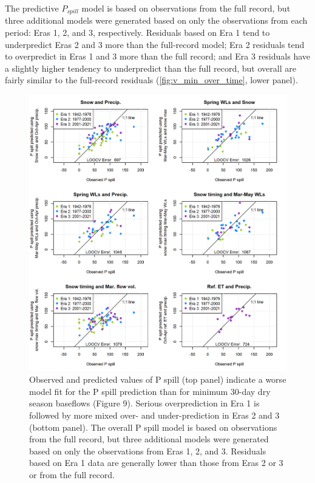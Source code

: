 \documentclass[
]{article}
\begin{document}
The predictive \(P_{spill}\) model is based on observations from the
full record, but three additional models were generated based on only
the observations from each period: Eras 1, 2, and 3, respectively.
Residuals based on Era 1 tend to underpredict Eras 2 and 3 more than the
full-record model; Era 2 residuals tend to overpredict in Eras 1 and 3
more than the full record; and Era 3 residuals have a slightly higher
tendency to underpredict than the full record, but overall are fairly
similar to the full-record residuals (\autoref{fig:v_min_over_time},
lower panel).

\begin{figure}
\includegraphics[width=1\linewidth]{f15} \caption{\label{fig:pspill_pred_over_time} Observed and predicted values of P spill (top panel) indicate a worse model fit for the P spill prediction than for minimum 30-day dry season baseflows (Figure 9). Serious overprediction in Era 1 is followed by more mixed over- and under-prediction in Eras 2 and 3 (bottom panel). The overall P spill model is based on observations from the full record, but three additional models were generated based on only the observations from Eras 1, 2, and 3. Residuals based on Era 1 data are generally lower than those from Eras 2 or 3 or from the full record.}\label{fig:pspill_pred_over_time}
\end{figure}
\end{document}
